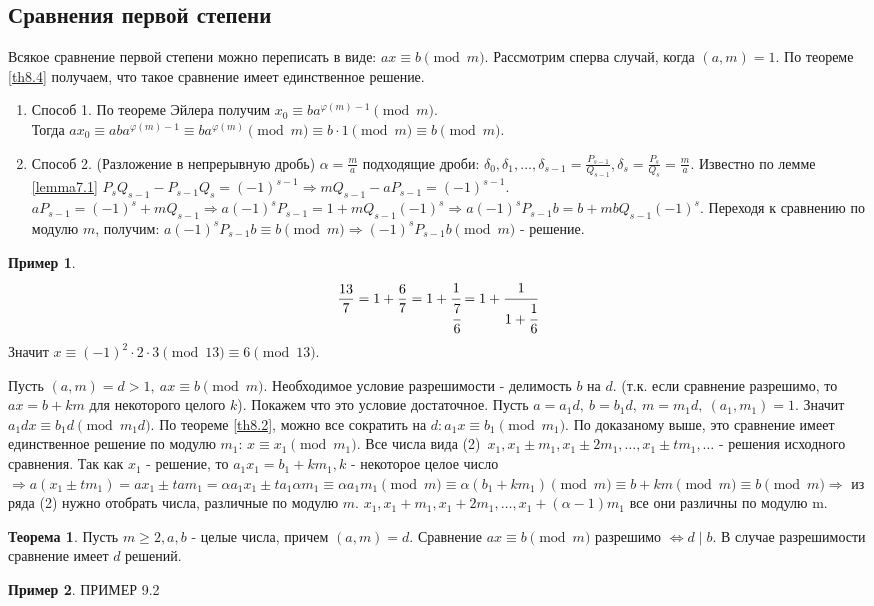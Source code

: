 \documentclass[a4paper, 12pt]{article}
\renewcommand{\phi}{\varphi}
\renewcommand{\div}{\mid}
\theoremstyle{definition}
\newtheorem{theorem}{Теорема}[section]
\newtheorem*{example}{Пример}
\begin{document}
    \subsection*{Сравнения первой степени}
    Всякое сравнение первой степени можно переписать в виде: $ax\equiv b\pmod{m}$. Рассмотрим сперва случай, когда $(a,m)=1$. По теореме \ref{th8.4} получаем, что такое сравнение имеет единственное решение.
    \begin{enumerate}
        \item Способ 1. По теореме Эйлера получим $x_0\equiv ba^{\phi(m)-1}\pmod{m}$.\\
        Тогда $ax_0\equiv aba^{\phi(m)-1}\equiv ba^{\phi(m)}\pmod{m}\equiv b\cdot 1 \pmod{m}\equiv b\pmod{m}$.
        \item Способ 2. (Разложение в непрерывную дробь)
        $\alpha=\frac{m}{a}$ подходящие дроби: $\delta_0,\delta_1,\dots,\delta_{s-1}=\frac{P_{s-1}}{Q_{s-1}}, \delta_s=\frac{P_s}{Q_s}=\frac{m}{a}$. Известно по лемме \ref{lemma7.1} $P_s Q_{s-1}-P_{s-1}Q_s=(-1)^{s-1}\Rightarrow mQ_{s-1}-aP_{s-1}=(-1)^{s-1}$. $aP_{s-1}=(-1)^s+mQ_{s-1}\Rightarrow a(-1)^s P_{s-1}=1+mQ_{s-1}(-1)^s\Rightarrow a(-1)^sP_{s-1}b=b+mbQ_{s-1}(-1)^s$. Переходя к сравнению по модулю $m$, получим: $a(-1)^s P_{s-1}b\equiv b \pmod{m}\Rightarrow (-1)^sP_{s-1}b\pmod{m}$ - решение.
    \end{enumerate}
    \begin{example}
        \[\frac{13}{7}=1+\frac{6}{7}=1+\cfrac{1}{\cfrac{7}{6}}=1+\cfrac{1}{1+\cfrac{1}{6}}\]
        Значит $x\equiv (-1)^2\cdot 2\cdot 3 \pmod{13}\equiv 6\pmod{13}$.
    \end{example}
    Пусть $(a,m)=d>1,\ ax\equiv b\pmod{m}$. Необходимое условие разрешимости - делимость $b$ на $d$.
    (т.к. если сравнение разрешимо, то $ax=b+km$ для некоторого целого $k$). Покажем что это условие достаточное. Пусть $a=a_1d,\ b=b_1d,\ m=m_1d,\ (a_1,m_1)=1$. Значит $a_1dx\equiv b_1d\pmod{m_1d}$. По теореме \ref{th8.2}, можно все сократить на $d: a_1x\equiv b_1\pmod{m_1}$. По доказаному выше, это сравнение имеет единственное решение по модулю $m_1$: $x\equiv x_1\pmod{m_1}$. Все числа вида (2)\ $x_1, x_1\pm m_1, x_1\pm 2m_1, \dots, x_1\pm tm_1,\dots$ - решения исходного сравнения. Так как $x_1$ - решение, то $a_1x_1=b_1+km_1, k$ - некоторое целое число $\Rightarrow a(x_1\pm tm_1)=ax_1\pm tam_1=\alpha a_1 x_1 \pm t a_1 \alpha m_1 \equiv \alpha a_1 m_1 \pmod{m}\equiv \alpha(b_1+km_1)\pmod{m}\equiv b+km \pmod{m}\equiv b\pmod{m} \Rightarrow$ из ряда (2) нужно отобрать числа, различные по модулю $m$. $x_1,x_1+m_1,x_1+2m_1,\dots,x_1+(\alpha-1)m_1$ все они различны по модулю m.
    \begin{theorem}\label{th9.1}
        Пусть $m\geq 2, a,b$ - целые числа, причем $(a,m)=d$. Сравнение $ax\equiv b \pmod{m}$ разрешимо $\Leftrightarrow d\div b$. В случае разрешимости сравнение имеет $d$ решений.
    \end{theorem} 
    \begin{example}
        ПРИМЕР 9.2    
    \end{example}
\end{document}
